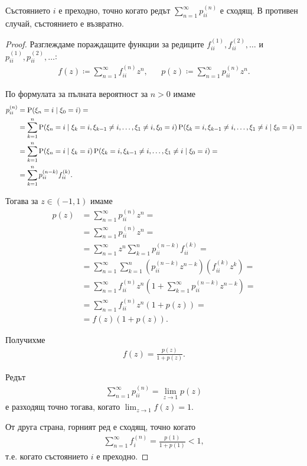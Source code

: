 \documentclass[numbers=endperiod, bibliography=totocnumbered]{scrartcl}
\begin{document}
\begin{theorem}\label{thm:trans-iff-divergent}
  Състоянието \( i \) е преходно, точно когато редът \( \sum_{n=1}^\infty p^{(n)}_{ii} \) е сходящ. В противен случай, състоянието е възвратно.
\end{theorem}
\begin{proof}
  Разглеждаме пораждащите функции за редиците \( f_{ii}^{(1)}, f_{ii}^{(2)}, \ldots \) и \( p_{ii}^{(1)}, p_{ii}^{(2)}, \ldots \):
  \begin{align*}
    f(z) \coloneqq \sum_{n=1}^\infty f_{ii}^{(n)} z^n,
    &&
    p(z) \coloneqq \sum_{n=1}^\infty p_{ii}^{(n)} z^n.
  \end{align*}

  По формулата за пълната вероятност за \( n > 0 \) имаме
  \small{
  \begin{align*}
    p_{ii}^{(n)}
    &=
    \operatorname{P}(\xi_n = i \mid \xi_0 = i)
    = \\ &=
    \sum_{k=1}^n \operatorname{P}(\xi_n = i \mid \xi_k = i, \xi_{k-1} \neq i, \ldots, \xi_1 \neq i, \xi_0 = i) \operatorname{P}(\xi_k = i, \xi_{k-1} \neq i, \ldots, \xi_1 \neq i \mid \xi_0 = i)
    = \\ &=
    \sum_{k=1}^n \operatorname{P}(\xi_n = i \mid \xi_k = i) \operatorname{P}(\xi_k = i, \xi_{k-1} \neq i, \ldots, \xi_1 \neq i \mid \xi_0 = i)
    = \\ &=
    \sum_{k=1}^n p_{ii}^{(n-k)} f_{ii}^{(k)}.
  \end{align*}
  }

  Тогава за \( z \in (-1, 1) \) имаме
  \begin{align*}
    p(z)
    &=
    \sum_{n=1}^\infty p_{ii}^{(n)} z^n
    = \\ &=
    \sum_{n=1}^\infty p_{ii}^{(n)} z^n
    = \\ &=
    \sum_{n=1}^\infty z^n \sum_{k=1}^n p_{ii}^{(n-k)} f_{ii}^{(k)}
    = \\ &=
    \sum_{n=1}^\infty \sum_{k=1}^n (p_{ii}^{(n-k)} z^{n-k}) (f_{ii}^{(k)} z^k)
    = \\ &=
    \sum_{n=1}^\infty f_{ii}^{(n)} z^n \left( 1 + \sum_{k=1}^\infty p_{ii}^{(n-k)} z^{n-k} \right)
    = \\ &=
    \sum_{n=1}^\infty f_{ii}^{(n)} z^n (1 + p(z))
    = \\ &=
    f(z) (1 + p(z)).
  \end{align*}

  Получихме
  \begin{align*}
    f(z) = \frac {p(z)} {1 + p(z)}.
  \end{align*}

  Редът
  \begin{align*}
    \sum_{n=1}^\infty p^{(n)}_{ii} = \lim_{z \to 1} p(z)
  \end{align*}
  е разходящ точно тогава, когато \( \lim_{z \to 1} f(z) = 1 \).

  От друга страна, горният ред е сходящ, точно когато
  \begin{align*}
    \sum_{n=1}^\infty f_i^{(n)} = \frac {p(1)} {1 + p(1)} < 1,
  \end{align*}
  т.е. когато състоянието \( i \) е преходно.
\end{proof}
\end{document}
